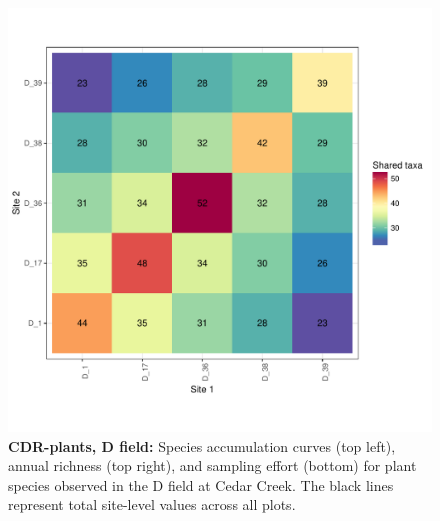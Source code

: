 \documentclass[11pt, oneside]{article}
\begin{document}
\begin{figure}[h!]
\includegraphics[scale = 0.4]{cdr-plantsD-compagnoni_spp_shared.pdf}
\caption{{\bf CDR-plants, D field:} Species accumulation curves (top left),  annual richness (top right), and sampling effort (bottom)  for plant species observed in the D field at Cedar Creek. The black lines represent total site-level values across all plots.}
\label{cdrD-plants}
\end{figure}
\end{document}
